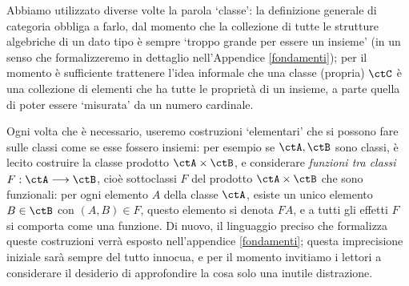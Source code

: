 Abbiamo utilizzato diverse volte la parola `classe': la definizione generale di categoria obbliga a farlo, dal momento che la collezione di tutte le strutture algebriche di un dato tipo è sempre `troppo grande per essere un insieme' (in un senso che formalizzeremo in dettaglio nell'Appendice \ref{fondamenti}); per il momento è sufficiente trattenere l'idea informale che una classe (propria) \(\ctC\) è una collezione di elementi che ha tutte le proprietà di un insieme, a parte quella di poter essere `misurata' da un numero cardinale.

Ogni volta che è necessario, useremo costruzioni `elementari' che si possono fare sulle classi come se esse fossero insiemi: per esempio se \(\ctA,\ctB\) sono classi, è lecito costruire la classe prodotto \(\ctA\times\ctB\), e considerare \emph{funzioni tra classi} \(F : \ctA\fun\ctB\), cioè sottoclassi \(F\) del prodotto \(\ctA\times\ctB\) che sono funzionali: per ogni elemento \(A\) della classe \(\ctA\), esiste un unico elemento \(B\in\ctB\) con \((A,B)\in F\), questo elemento si denota \(FA\), e a tutti gli effetti \(F\) si comporta come una funzione. Di nuovo, il linguaggio preciso che formalizza queste costruzioni verrà esposto nell'appendice \ref{fondamenti}; questa imprecisione iniziale sarà sempre del tutto innocua, e per il momento invitiamo i lettori a considerare il desiderio di approfondire la cosa solo una inutile distrazione.
